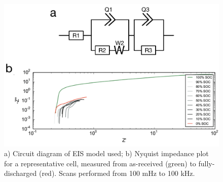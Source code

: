 \begin{figure}[htb]
  \centering
    \includegraphics[width=\textwidth]{ch-appendices/Supp5.pdf}
    \caption[Equivalent circuit model and Nyquist plot for \textit{in situ} EIS performed on a AA alkaline battery]{a) Circuit diagram of EIS model used; b) Nyquist impedance plot for a representative cell, measured from as-received (green) to fully-discharged (red). Scans performed from 100 mHz to 100 kHz.}
    \label{fig:EIS}
\end{figure}